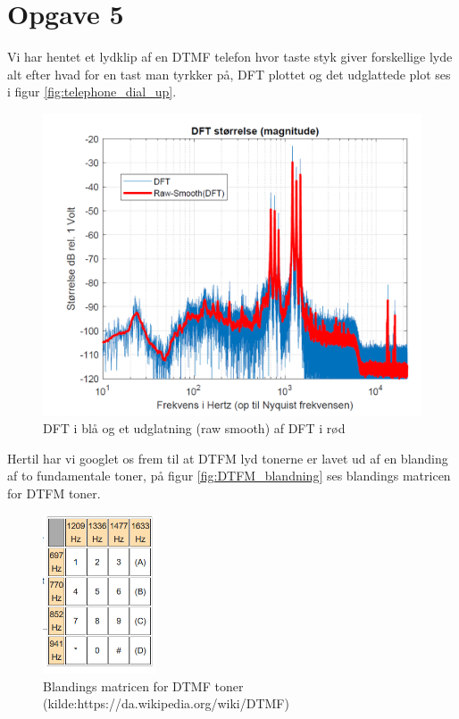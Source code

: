 \section{Opgave 5}

Vi har hentet et lydklip af en DTMF telefon hvor taste styk giver forskellige lyde alt efter hvad for en tast man tyrkker på, DFT plottet og det udglattede plot ses i figur  \autoref{fig:telephone_dial_up}.


\begin{figure}[H]
\centering
\includegraphics[width=\textwidth]{"figures/opgave5_1.png"}
\caption{DFT i blå og et udglatning (raw smooth) af DFT i rød}
\label{fig:telephone_dial_up}
\end{figure}

Hertil har vi googlet os frem til at DTFM lyd tonerne er lavet ud af en blanding af to fundamentale toner, på figur \autoref{fig:DTFM_blandning} ses blandings matricen for DTFM toner. 

\begin{figure}[H]
\centering
\includegraphics[width=0.3\textwidth]{"figures/DTFM.png"}
\caption{Blandings matricen for DTMF toner (kilde:https://da.wikipedia.org/wiki/DTMF)}
\label{fig:DTFM_blandning}
\end{figure}

